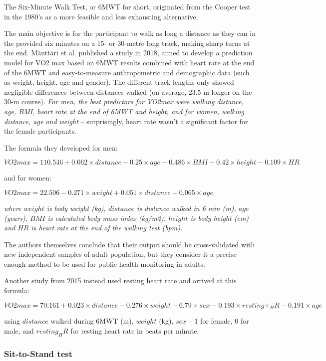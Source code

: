 The Six-Minute Walk Test, or 6MWT for short, originated from the Cooper test in the 1980's as a more feasible and less exhausting alternative.\cite{6mwt-history}

The main objective is for the participant to walk as long a distance as they can in the provided six minutes on a 15- or 30-metre long track, making sharp turns at the end.
Mänttäri et al. published a study in 2018\cite{6min-walk-test-mantarri}, aimed to develop a prediction model for VO2 max based on 6MWT results combined with heart rate at the end of the 6MWT and easy-to-measure anthropometric and demographic data (such as weight, height, age and gender).
The different track lengths only showed negligible differences between distances walked (on average, 23.5 m longer on the 30-m course).
\textit{For men, the best predictors for VO2max were walking distance, age, BMI, heart rate at the end of 6MWT and height, and for women, walking distance, age and weight} -- surprisingly, heart rate wasn't a significant factor for the female participants.

The formula they developed for men:

 $VO2 max=110.546 + 0.062\times distance - 0.25\times age - 0.486\times BMI - 0.42\times height - 0.109\times HR$

 and for women:

 $VO2 max=22.506 - 0.271\times weight + 0.051\times distance - 0.065\times age$

 \textit{where $weight$ is body weight (kg), $distance$ is distance walked in 6 min (m), $age$ (years), $BMI$ is calculated body mass index (kg/m2), $height$ is body height (cm) and $HR$ is heart rate at the end of the walking test (bpm).}

The authors themselves conclude that their output should be cross-validated with new independent samples of adult population,
but they consider it a precise enough method to be used for public health monitoring in adults.

Another study from 2015\cite{6min-walk-test-burr} instead used resting heart rate and arrived at this formula:

$VO2 max =70.161 + 0.023 \times distance - 0.276 \times weight - 6.79 \times sex - 0.193 \times resting +_HR - 0.191 \times age$

using $distance$ walked during 6MWT (m), $weight$ (kg), $sex$ -- 1 for female, 0 for male, and $resting_HR$ for resting heart rate in beats per minute.

\subsubsection*{Sit-to-Stand test}

